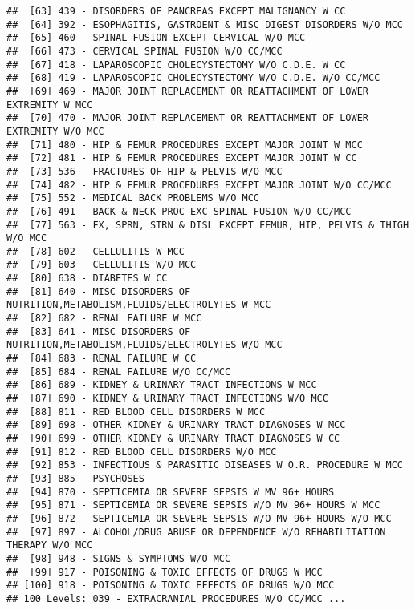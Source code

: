 \documentclass[]{article}
\begin{document}
\begin{verbatim}
##  [63] 439 - DISORDERS OF PANCREAS EXCEPT MALIGNANCY W CC                        
##  [64] 392 - ESOPHAGITIS, GASTROENT & MISC DIGEST DISORDERS W/O MCC              
##  [65] 460 - SPINAL FUSION EXCEPT CERVICAL W/O MCC                               
##  [66] 473 - CERVICAL SPINAL FUSION W/O CC/MCC                                   
##  [67] 418 - LAPAROSCOPIC CHOLECYSTECTOMY W/O C.D.E. W CC                        
##  [68] 419 - LAPAROSCOPIC CHOLECYSTECTOMY W/O C.D.E. W/O CC/MCC                  
##  [69] 469 - MAJOR JOINT REPLACEMENT OR REATTACHMENT OF LOWER EXTREMITY W MCC    
##  [70] 470 - MAJOR JOINT REPLACEMENT OR REATTACHMENT OF LOWER EXTREMITY W/O MCC  
##  [71] 480 - HIP & FEMUR PROCEDURES EXCEPT MAJOR JOINT W MCC                     
##  [72] 481 - HIP & FEMUR PROCEDURES EXCEPT MAJOR JOINT W CC                      
##  [73] 536 - FRACTURES OF HIP & PELVIS W/O MCC                                   
##  [74] 482 - HIP & FEMUR PROCEDURES EXCEPT MAJOR JOINT W/O CC/MCC                
##  [75] 552 - MEDICAL BACK PROBLEMS W/O MCC                                       
##  [76] 491 - BACK & NECK PROC EXC SPINAL FUSION W/O CC/MCC                       
##  [77] 563 - FX, SPRN, STRN & DISL EXCEPT FEMUR, HIP, PELVIS & THIGH W/O MCC     
##  [78] 602 - CELLULITIS W MCC                                                    
##  [79] 603 - CELLULITIS W/O MCC                                                  
##  [80] 638 - DIABETES W CC                                                       
##  [81] 640 - MISC DISORDERS OF NUTRITION,METABOLISM,FLUIDS/ELECTROLYTES W MCC    
##  [82] 682 - RENAL FAILURE W MCC                                                 
##  [83] 641 - MISC DISORDERS OF NUTRITION,METABOLISM,FLUIDS/ELECTROLYTES W/O MCC  
##  [84] 683 - RENAL FAILURE W CC                                                  
##  [85] 684 - RENAL FAILURE W/O CC/MCC                                            
##  [86] 689 - KIDNEY & URINARY TRACT INFECTIONS W MCC                             
##  [87] 690 - KIDNEY & URINARY TRACT INFECTIONS W/O MCC                           
##  [88] 811 - RED BLOOD CELL DISORDERS W MCC                                      
##  [89] 698 - OTHER KIDNEY & URINARY TRACT DIAGNOSES W MCC                        
##  [90] 699 - OTHER KIDNEY & URINARY TRACT DIAGNOSES W CC                         
##  [91] 812 - RED BLOOD CELL DISORDERS W/O MCC                                    
##  [92] 853 - INFECTIOUS & PARASITIC DISEASES W O.R. PROCEDURE W MCC              
##  [93] 885 - PSYCHOSES                                                           
##  [94] 870 - SEPTICEMIA OR SEVERE SEPSIS W MV 96+ HOURS                          
##  [95] 871 - SEPTICEMIA OR SEVERE SEPSIS W/O MV 96+ HOURS W MCC                  
##  [96] 872 - SEPTICEMIA OR SEVERE SEPSIS W/O MV 96+ HOURS W/O MCC                
##  [97] 897 - ALCOHOL/DRUG ABUSE OR DEPENDENCE W/O REHABILITATION THERAPY W/O MCC 
##  [98] 948 - SIGNS & SYMPTOMS W/O MCC                                            
##  [99] 917 - POISONING & TOXIC EFFECTS OF DRUGS W MCC                            
## [100] 918 - POISONING & TOXIC EFFECTS OF DRUGS W/O MCC                          
## 100 Levels: 039 - EXTRACRANIAL PROCEDURES W/O CC/MCC ...
\end{verbatim}
\end{document}
